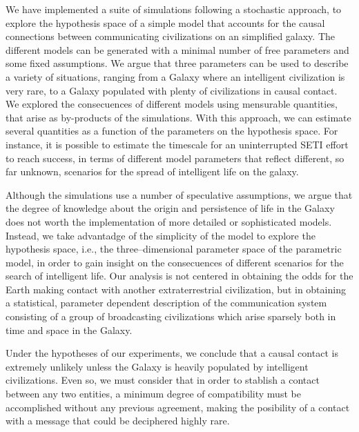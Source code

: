 \documentclass[crop]{CSLB}%
\begin{document}
We have implemented a suite of simulations following a stochastic
approach, to explore the hypothesis space of a simple model that
accounts for the causal connections between communicating
civilizations on an simplified galaxy.
%
The different models can be generated with a minimal number of free
parameters and some fixed assumptions.
%
We argue that three parameters can be used to describe a variety of
situations, ranging from a Galaxy where an intelligent civilization is
very rare, to a Galaxy populated with plenty of civilizations in
causal contact.
%
We explored the consecuences of different models using mensurable
quantities, that arise as by-products of the simulations.
%
With this approach, we can estimate several quantities as a function
of the parameters on the hypothesis space.
%
For instance, it is possible to estimate the timescale for an
uninterrupted SETI effort to reach success, in terms of different
model parameters that reflect different, so far unknown, scenarios for
the spread of intelligent life on the galaxy.


Although the simulations use a number of speculative assumptions, we
argue that the degree of knowledge about the origin and persistence of
life in the Galaxy does not worth the implementation of more detailed
or sophisticated models.
%
Instead, we take advantadge of the simplicity of the model to explore
the hypothesis space, i.e., the three--dimensional parameter space of
the parametric model, in order to gain insight on the consecuences of
different scenarios for the search of intelligent life.
%
Our analysis is not centered in obtaining the odds for the Earth
making contact with another extraterrestrial civilization, but in
obtaining a statistical, parameter dependent description of the
communication system consisting of a group of broadcasting
civilizations which arise sparsely both in time and space in the
Galaxy.



Under the hypotheses of our experiments, we conclude that a causal
contact is extremely unlikely unless the Galaxy is heavily populated
by intelligent civilizations.
%
Even so, we must consider that in order to stablish a contact between
any two entities, a minimum degree of compatibility must be
accomplished without any previous agreement, making the posibility of
a contact with a message that could be deciphered highly rare.
\end{document}
